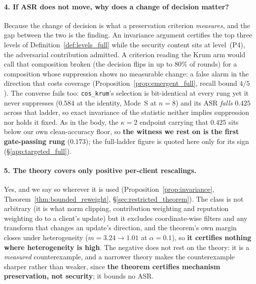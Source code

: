 \documentclass{article}
\begin{document}
\paragraph{4. If ASR does not move, why does a change of decision matter?} Because the change of
decision is what a preservation criterion \emph{measures}, and the gap between the two is the finding.
An invariance argument certifies the top three levels of Definition~\ref{def:levels_full} while the security
content sits at level~(P4), the adversarial contribution admitted. A criterion reading the Krum arm would
call that composition broken (the decision flips in up to $80\%$ of rounds) for a composition whose
suppression shows no measurable change: a false alarm in the direction that costs coverage
(Proposition~\ref{prop:emergent_full}, recall bound $4/5$). The converse fails too: \texttt{cos\_krum}'s
selection is bit-identical at every rung yet it never suppresses ($0.584$ at the identity, Mode~S at
$n{=}8$) and its ASR \emph{falls} $0.425$ across that ladder, so exact invariance of the statistic
neither implies suppression nor holds it fixed. As in the body, the $\kappa{=}2$ endpoint carrying that
$0.425$ sits below our own clean-accuracy floor, so \textbf{the witness we rest on is the first
gate-passing rung} ($0.173$); the full-ladder figure is quoted here only for its sign
(§\ref{app:targeted_full}).

\paragraph{5. The theory covers only positive per-client rescalings.} Yes, and we say so wherever it is
used (Proposition~\ref{prop:invariance}, Theorem~\ref{thm:bounded_reweight},
§\ref{sec:restricted_theorem}). The class is not arbitrary (it is what norm clipping, contribution
weighting and reputation weighting do to a client's update) but it excludes coordinate-wise filters and
any transform that changes an update's direction, and the theorem's own margin closes under heterogeneity
($m{=}3.24 \to 1.01$ at $\alpha{=}0.1$), so \textbf{it certifies nothing where heterogeneity is high}.
The negative does not rest on the theory: it is a \emph{measured} counterexample, and a narrower theory
makes the counterexample sharper rather than weaker, since \textbf{the theorem certifies mechanism
preservation, not security}; it bounds no ASR.
\end{document}
